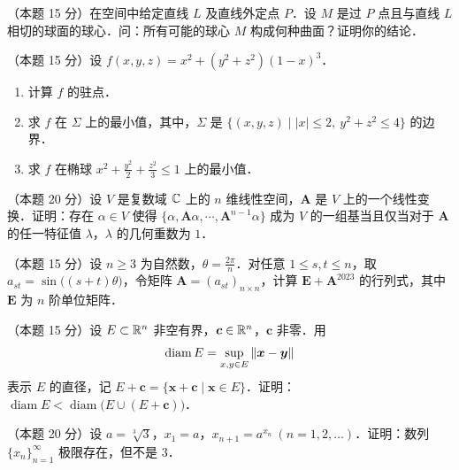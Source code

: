 
\begin{problems}
\item[一、]（本题 15 分）在空间中给定直线 $L$ 及直线外定点 $P$．设 $M$ 是过 $P$ 点且与直线 $L$ 相切的球面的球心．问：所有可能的球心 $M$ 构成何种曲面？证明你的结论．

\item[二、]（本题 15 分）设 $f(x,y,z)=x^{2}+(y^{2}+z^{2})(1-x)^{3}$．
\begin{enumerate}[label=(\arabic*)]
  \item 计算 $f$ 的驻点．
  \item 求 $f$ 在 $\Sigma$ 上的最小值，其中，$\Sigma$ 是 $\{(x,y,z)\mid |x|\le 2,\ y^{2}+z^{2}\le 4\}$ 的边界．
  \item 求 $f$ 在椭球 $x^{2}+\frac{y^{2}}{2}+\frac{z^{2}}{3}\le 1$ 上的最小值．
\end{enumerate}

\item[三、]（本题 20 分）设 $V$ 是复数域 $\mathbb{C}$ 上的 $n$ 维线性空间，$\bm{A}$ 是 $V$ 上的一个线性变换．证明：存在 $\alpha\in V$ 使得 $\{\alpha,\bm{A}\alpha,\cdots,\bm{A}^{n-1}\alpha\}$ 成为 $V$ 的一组基当且仅当对于 $\bm{A}$ 的任一特征值 $\lambda$，$\lambda$ 的几何重数为 $1$．

\item[四、]（本题 15 分）设 $n\ge 3$ 为自然数，$\theta=\frac{2\pi}{n}$．对任意 $1\le s,t\le n$，取 $a_{st}=\sin\bigl((s+t)\theta\bigr)$，令矩阵 $\bm{A}=(a_{st})_{n\times n}$，计算 $\bm{E}+\bm{A}^{2023}$ 的行列式，其中 $\bm{E}$ 为 $n$ 阶单位矩阵．

\item[五、]（本题 15 分）设 $E\subset\mathbb{R}^{n}$ 非空有界，$\bm{c}\in\mathbb{R}^{n}$，$\bm{c}$ 非零．用
\[
  \operatorname{diam}E=\sup_{x,y\in E}\left\|\bm{x}-\bm{y}\right\|
\]
表示 $E$ 的直径，记 $E+\bm{c}=\{\bm{x}+\bm{c}\mid \bm{x}\in E\}$．证明：$\operatorname{diam}E<\operatorname{diam}\bigl(E\cup(E+\bm{c})\bigr)$．

\item[六、]（本题 20 分）设 $a=\sqrt[3]{3}$，$x_{1}=a$，$x_{n+1}=a^{x_{n}}\ (n=1,2,\dots)$．证明：数列 $\{x_{n}\}_{n=1}^{\infty}$ 极限存在，但不是 $3$．
\end{problems}
